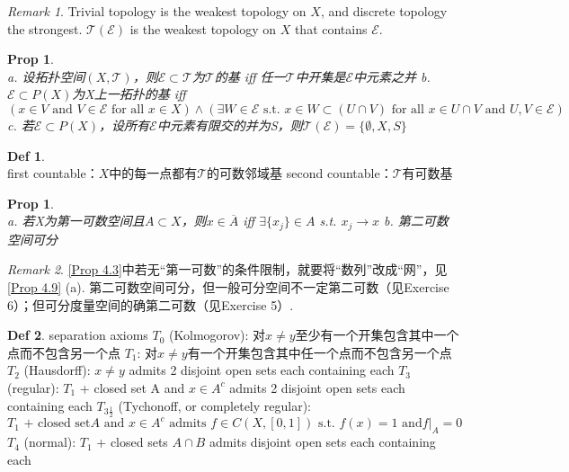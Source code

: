 \documentclass[hidelinks]{article}
\theoremstyle{definition}
\newtheorem*{defin}{Def}
\theoremstyle{plain}
\newtheorem{proposition}[theorem]{Prop}
\theoremstyle{remark}
\newtheorem*{remark}{Remark}
\begin{document}
\begin{remark}
Trivial topology is the weakest topology on $X$, and discrete topology the strongest. $\mathscr{T}(\mathscr{E})$ is the weakest topology on $X$ that contains $\mathscr{E}$.
\end{remark}

\begin{proposition}\label{Prop 4.2}~\\
a. 设拓扑空间$(X,\mathscr{T})$，则$\mathscr{E}\subset \mathscr{T}$为$\mathscr{T}$的基 \textrm{iff} 任一$\mathscr{T}$中开集是$\mathscr{E}$中元素之并 \newline
b. $\mathscr{E}\subset P(X)$为X上一拓扑的基 \textrm{iff} 
\[
(x\in V\textrm{ and }V\in \mathscr{E}\textrm{ for all } x\in X)\wedge(\exists W\in \mathscr{E}\textrm{ s.t. }x\in W\subset (U\cap V)\textrm{ for all }x\in U\cap V\textrm{ and }U,V\in \mathscr{E})
\]
c. 若$\mathscr{E}\subset P(X)$，设所有$\mathscr{E}$中元素有限交的并为S，则$\mathscr{T}(\mathscr{E})=\{\emptyset,X,S\}$
\end{proposition}

\begin{defin}~\\
first countable：$X$中的每一点都有$\mathscr{T}$的可数邻域基 \newline
second countable：$\mathscr{T}$有可数基
\end{defin}

\begin{proposition}\label{Prop 4.3}~\\
a. 若X为第一可数空间且$A\subset X$，则$x\in \overline{A}$ \textrm{iff} $\exists\{x_j\}\in A$ \textrm{s.t. }$x_j\to x$ \newline
b. 第二可数空间可分
\end{proposition}

\begin{remark}
\autoref{Prop 4.3}中若无“第一可数”的条件限制，就要将“数列”改成“网”，见\autoref{Prop 4.9} (a). 第二可数空间可分，但一般可分空间不一定第二可数（见Exercise 6）；但可分度量空间的确第二可数（见Exercise 5）.
\end{remark}

\begin{defin}
separation axioms \newline
$T_0$ (Kolmogorov): 对$x\neq y$至少有一个开集包含其中一个点而不包含另一个点 \newline
$T_1$: 对$x\neq y$有一个开集包含其中任一个点而不包含另一个点 \newline
$T_2$ (Hausdorff): $x\neq y$ admits 2 disjoint open sets each containing each \newline
$T_3$ (regular): $T_1$ + closed set A and $x\in A^c$ admits 2 disjoint open sets each containing each \newline
$T_{3\frac{1}{2}}$ (Tychonoff, or completely regular):
$$
T_1\textrm{ + closed set} A\textrm{ and } x\in A^c \textrm{ admits } f\in C(X,[0,1]) \textrm{ s.t. } f(x)=1 \textrm{ and} \left.f\right|_A=0
$$
$T_4$ (normal): $T_1$ + closed sets $A\cap B$ admits  disjoint open sets each containing each
\end{defin}
\end{document}
